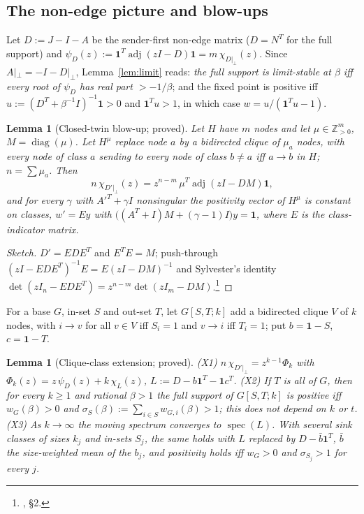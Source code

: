 \documentclass[11pt]{article}
\newtheorem{lemma}[theorem]{Lemma}
\theoremstyle{definition}
\newcommand{\one}{\mathbf{1}}
\newcommand{\perpc}[1]{#1|_{\perp}}
\newcommand{\adj}{\operatorname{adj}}
\newcommand{\spec}{\operatorname{spec}}
\begin{document}
{\subsection{The non-edge picture and blow-ups}
Let $D:=J-I-A$ be the sender-first non-edge matrix ($D=N^T$ for the full support) and
$\psi_D(z):=\one^T\adj(zI-D)\one=m\,\chi_{\perpc{D}}(z)$. Since $\perpc{A}=-I-\perpc{D}$, Lemma~\ref{lem:limit} reads:
\emph{the full support is limit-stable at $\beta$ iff every root of $\psi_D$ has real part $>-1/\beta$}; and the fixed point is
positive iff $u:=(D^T+\beta^{-1}I)^{-1}\one>0$ and $\one^Tu>1$, in which case $w=u/(\one^Tu-1)$.

\begin{lemma}[Closed-twin blow-up; proved]\label{lem:W}
Let $H$ have $m$ nodes and let $\mu\in\mathbb Z_{>0}^m$, $M=\operatorname{diag}(\mu)$. Let $H^\mu$ replace node $a$ by a bidirected
clique of $\mu_a$ nodes, with every node of class $a$ sending to every node of class $b\ne a$ iff $a\to b$ in $H$; $n=\sum\mu_a$.
Then
\[
n\,\chi_{\perpc{D'}}(z)=z^{n-m}\,\mu^T\adj(zI-DM)\one,
\]
and for every $\gamma$ with $A'^T+\gamma I$ nonsingular the positivity vector of $H^\mu$ is constant on classes, $w'=Ey$ with
$\bigl((A^T+I)M+(\gamma-1)I\bigr)y=\one$, where $E$ is the class-indicator matrix.
\end{lemma}
\begin{proof}[Sketch]
$D'=EDE^T$ and $E^TE=M$; push-through $(zI-EDE^T)^{-1}E=E(zI-DM)^{-1}$ and Sylvester's identity
$\det(zI_n-EDE^T)=z^{n-m}\det(zI_m-DM)$.\footnote{, \S2.}
\end{proof}

For a base $G$, in-set $S$ and out-set $T$, let $G[S,T;k]$ add a bidirected clique $V$ of $k$ nodes, with $i\to v$ for all $v\in V$
iff $S_i=1$ and $v\to i$ iff $T_i=1$; put $b=\one-S$, $c=\one-T$.

\begin{lemma}[Clique-class extension; proved]\label{lem:X}
(X1) $n\,\chi_{\perpc{D'}}=z^{k-1}\Phi_k$ with $\Phi_k(z)=z\,\psi_D(z)+k\,\chi_L(z)$, $L:=D-b\one^T-\one c^T$.
(X2) If $T$ is all of $G$, then for every $k\ge1$ and rational $\beta>1$ the full support of $G[S,T;k]$ is positive iff
$w_G(\beta)>0$ and $\sigma_S(\beta):=\sum_{i\in S}w_{G,i}(\beta)>1$; this does not depend on $k$ or $t$.
(X3) As $k\to\infty$ the moving spectrum converges to $\spec(L)$. With several sink classes of sizes $k_j$ and in-sets $S_j$,
the same holds with $L$ replaced by $D-\bar b\one^T$, $\bar b$ the size-weighted mean of the $b_j$, and positivity holds iff
$w_G>0$ and $\sigma_{S_j}>1$ for every $j$.
\end{lemma}

}
\end{document}
